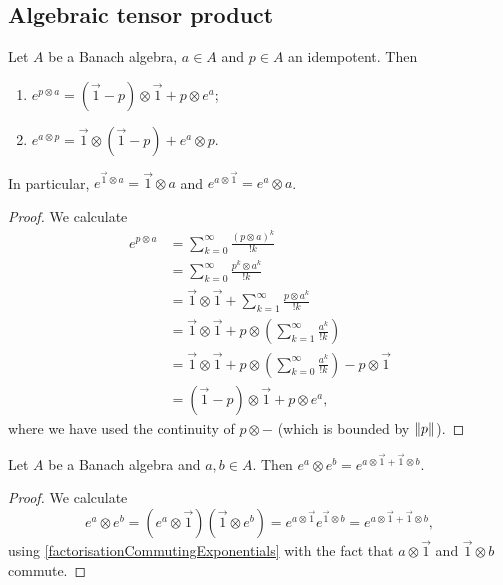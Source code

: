\subsection{Algebraic tensor product}
\begin{proposition}
Let $A$ be a Banach algebra, $a\in A$ and $p\in A$ an idempotent. Then
\begin{enumerate}
\item $e^{p\otimes a} = (\vec{1}-p)\otimes \vec{1} + p\otimes e^a$;
\item $e^{a\otimes p} = \vec{1}\otimes (\vec{1}-p) + e^a\otimes p$.
\end{enumerate}
In particular, $e^{\vec{1}\otimes a} = \vec{1}\otimes a$ and $e^{a\otimes \vec{1}} = e^a\otimes a$.
\end{proposition}
\begin{proof}
We calculate
\begin{align*}
e^{p\otimes a} &= \sum_{k=0}^\infty \frac{(p\otimes a)^k}{!k} \\
&= \sum_{k=0}^\infty \frac{p^k\otimes a^k}{!k} \\
&= \vec{1}\otimes \vec{1} + \sum_{k=1}^\infty \frac{p\otimes a^k}{!k} \\
&= \vec{1}\otimes \vec{1} + p\otimes\left(\sum_{k=1}^\infty \frac{a^k}{!k}\right) \\
&= \vec{1}\otimes \vec{1} + p\otimes\left(\sum_{k=0}^\infty \frac{a^k}{!k}\right) - p\otimes \vec{1} \\
&= (\vec{1} - p)\otimes \vec{1} + p\otimes e^a,
\end{align*}
where we have used the continuity of $p\otimes -$ (which is bounded by $\lVert p\rVert$).
\end{proof}
\begin{corollary}
Let $A$ be a Banach algebra and $a,b\in A$. Then $e^a\otimes e^b = e^{a\otimes \vec{1} + \vec{1}\otimes b}$.
\end{corollary}
\begin{proof}
We calculate
\[ e^a\otimes e^b = (e^a\otimes \vec{1})(\vec{1}\otimes e^b) = e^{a\otimes \vec{1}}e^{\vec{1}\otimes b} = e^{a\otimes \vec{1} + \vec{1}\otimes b}, \]
using \ref{factorisationCommutingExponentials} with the fact that $a\otimes \vec{1}$ and $\vec{1}\otimes b$ commute.
\end{proof}

